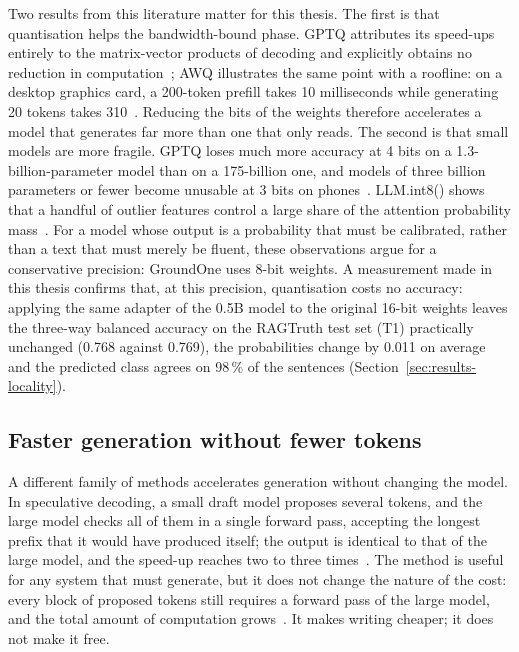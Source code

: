 Two results from this literature matter for this thesis. The first is that quantisation helps the bandwidth-bound phase.
GPTQ attributes its speed-ups entirely to the matrix-vector products of decoding and explicitly obtains no reduction in
computation~\cite{frantar2023gptq}; AWQ illustrates the same point with a roofline: on a desktop graphics card, a
200-token prefill takes 10 milliseconds while generating 20 tokens takes 310~\cite{lin2024awq}. Reducing the bits of the
weights therefore accelerates a model that generates far more than one that only reads. The second is that small models
are more fragile. GPTQ loses much more accuracy at 4 bits on a 1.3-billion-parameter model than on a 175-billion one, and
models of three billion parameters or fewer become unusable at 3 bits on phones~\cite{frantar2023gptq,laskaridis2024melting}.
LLM.int8() shows that a handful of outlier features control a large share of the attention probability
mass~\cite{dettmers2022llmint8}. For a model whose output is a probability that must be calibrated, rather than a text
that must merely be fluent, these observations argue for a conservative precision: GroundOne uses 8-bit weights. A measurement made in this thesis
confirms that, at this precision, quantisation costs no accuracy: applying the same adapter of the 0.5B model to the
original 16-bit weights leaves the three-way balanced accuracy on the RAGTruth test set (T1) practically unchanged (0.768 against 0.769), the
probabilities change by 0.011 on average and the predicted class agrees on 98\,\% of the sentences
(Section~\ref{sec:results-locality}).

\subsection{Faster generation without fewer tokens}
\label{sec:local-speculative}

A different family of methods accelerates generation without changing the model. In speculative decoding, a small draft
model proposes several tokens, and the large model checks all of them in a single forward pass, accepting the longest
prefix that it would have produced itself; the output is identical to that of the large model, and the speed-up reaches
two to three times~\cite{leviathan2023speculative}. The method is useful for any system that must generate, but it
does not change the nature of the cost: every block of proposed tokens still requires a forward pass of the large model, and the
total amount of computation grows~\cite{leviathan2023speculative}. It makes writing cheaper; it does not make it free.

